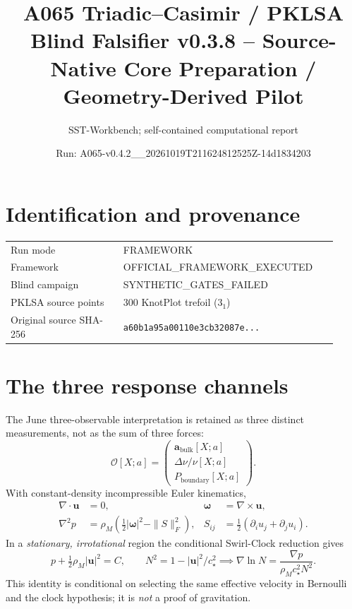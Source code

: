 \documentclass[10pt,a4paper]{article}
\title{A065 Triadic--Casimir / PKLSA\\ Blind Falsifier v0.3.8 -- Source-Native Core Preparation / Geometry-Derived Pilot}
\author{SST-Workbench; self-contained computational report}
\date{Run: A065-v0.4.2\_\_20261019T211624812525Z-14d1834203}
\begin{document}
\maketitle
\begin{center}
\end{center}
\section{Identification and provenance}
\begin{tabular}{@{}p{0.32\linewidth}p{0.60\linewidth}@{}}
\toprule
Run mode & FRAMEWORK \\
Framework & OFFICIAL\_FRAMEWORK\_EXECUTED \\
Blind campaign & SYNTHETIC\_GATES\_FAILED \\
PKLSA source points & 300 KnotPlot trefoil ($3_1$) \\
Original source SHA-256 & \texttt{a60b1a95a00110e3cb32087e...} \\
\bottomrule
\end{tabular}
\section{The three response channels}
The June three-observable interpretation is retained as three distinct measurements, not as the sum of three forces:
\[
\mathcal O[X;a]=\begin{pmatrix}
\mathbf a_{\mathrm{bulk}}[X;a]\\
\Delta\nu/\nu[X;a]\\
P_{\mathrm{boundary}}[X;a]
\end{pmatrix}.
\]
With constant-density incompressible Euler kinematics,
\begin{align}
\nabla\cdot\mathbf u&=0,&
\boldsymbol\omega&=\nabla\times\mathbf u,\\
\nabla^2p&=\rho_M\left(\tfrac12|\boldsymbol\omega|^2-\|S\|_F^2\right),&
S_{ij}&=\tfrac12(\partial_i u_j+\partial_j u_i).
\end{align}
In a \emph{stationary, irrotational} region the conditional Swirl-Clock reduction gives
\[
p+\tfrac12\rho_M|\mathbf u|^2=C,\qquad
N^2=1-|\mathbf u|^2/c_\star^2
\implies\nabla\ln N=\frac{\nabla p}{\rho_Mc_\star^2N^2}.
\]
This identity is conditional on selecting the same effective velocity in Bernoulli and the clock hypothesis; it is \emph{not} a proof of gravitation.
\end{document}
